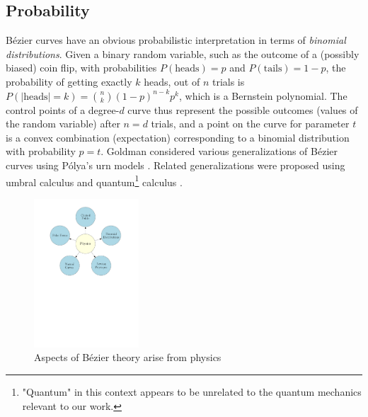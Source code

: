 \documentclass[final,3p,mathptmx]{elsarticle}
\begin{document}
\subsection{Probability}\label{sec:motivation:prob}
B\'{e}zier curves have an obvious probabilistic interpretation in terms of \emph{binomial distributions}. Given a binary random variable, such as the outcome of a (possibly biased) coin flip, with probabilities $P(\mathrm{heads}) = p$ and $P(\mathrm{tails}) = 1-p$, the probability of getting exactly $k$ heads, out of $n$ trials is $P(\left| \mathrm{heads}\right| = k) = {n \choose k} (1-p)^{n-k}p^{k} $, which is a Bernstein polynomial. The control points of a degree-$d$ curve thus represent the possible outcomes (values of the random variable) after $n = d$ trials, and a point on the curve for parameter $t$ is a convex combination (expectation) corresponding to a binomial distribution with probability $p = t$. Goldman considered various generalizations of B\'{e}zier curves using P\'{o}lya's urn models \cite{goldman1985polya}. Related generalizations were proposed using umbral calculus \cite{winkel2001generalized,winkel2014generalization,winkel2015generalization,winkel2016generalization} and quantum\footnote{"Quantum" in this context appears to be unrelated to the quantum mechanics relevant to our work.} calculus \cite{orucc2003q,goldman2012formulas,goldman2015quantum}.

\begin{figure}[h]
	\centering
	\includegraphics[width=0.35\textwidth, keepaspectratio]{figures/circles.pdf}
	\caption{Aspects of B\'{e}zier theory arise from physics}
	\label{fig:circles}
\end{figure}
\end{document}
